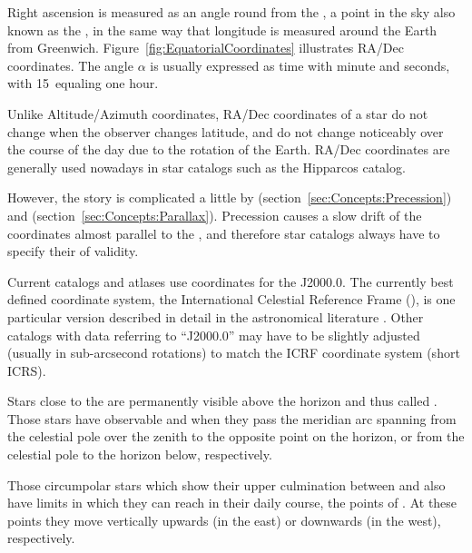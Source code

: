 Right ascension is measured as an angle round from the , a point in the sky
also known as the  \Aries, in the same way that
longitude is measured around the Earth from
Greenwich. Figure~\ref{fig:EquatorialCoordinates} illustrates RA/Dec
coordinates. The angle $\alpha$ is usually expressed as time with
minute and seconds, with 15\degree\ equaling one hour.

Unlike Altitude/Azimuth coordinates, RA/Dec coordinates of a star do
not change when the observer changes latitude, and do not change
noticeably over the course of the day due to the rotation of the
Earth.  RA/Dec coordinates are generally used nowadays in star
catalogs such as the Hipparcos catalog.

However, the story is complicated a little by 
(section~\ref{sec:Concepts:Precession}) and 
(section~\ref{sec:Concepts:Parallax}). Precession causes a slow drift
of the coordinates almost parallel to the ,
and therefore star catalogs always have to specify their  of
validity.

Current catalogs and atlases use coordinates for the
 J2000.0. The currently best defined
coordinate system, the International Celestial Reference Frame
(), is one particular version described in detail in
the astronomical literature \citep{ESAA:2013}. Other catalogs with data
referring to ``J2000.0'' may have to be slightly adjusted (usually in
sub-arcsecond rotations) to match the ICRF coordinate system (short ICRS).

Stars close to the  are
permanently visible above the horizon and thus called
.  Those stars have observable
 and  when they pass the meridian arc spanning
from the celestial pole over the zenith to the opposite point on the
horizon, or from the celestial pole to the horizon below,
respectively.

Those circumpolar stars which show their upper culmination between
 and  also have
limits in  which they can reach in their daily course,
 the points of . At these points they move vertically
upwards (in the east) or downwards (in the west), respectively.

